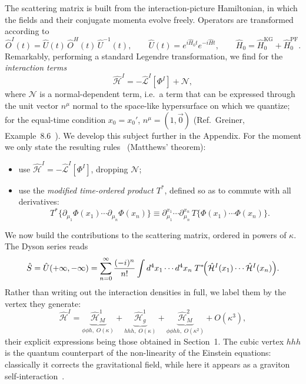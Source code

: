 \documentclass[12pt,a4paper,oneside]{article}
\numberwithin{equation}{section}   %
\begin{document}
The scattering matrix is built from the interaction-picture Hamiltonian, in
which the fields and their conjugate momenta evolve freely. Operators are
transformed according to
\begin{equation}
    \hat{O}^I(t)=\hat{U}(t)\,\hat{O}^H(t)\,\hat{U}^{-1}(t),\qquad
    \hat U(t)=e^{i\hat H_0t}e^{-i\hat Ht},\qquad
    \hat H_0=\hat H_0^{\mathrm{KG}}+\hat H_0^{\mathrm{PF}} .
\end{equation}
Remarkably, performing a standard Legendre transformation, we find for the
\textit{interaction terms}
\begin{equation}\label{HIN}
    \hat{\mathcal{H}}^I=-\hat{\mathcal{L}}^I[\Phi^I] + \mathcal{N},
\end{equation}
where $\mathcal{N}$ is a normal-dependent term, i.e.\ a term that can be
expressed through the unit vector $n^\mu$ normal to the space-like
hypersurface on which we quantize; for the equal-time condition $x_0=x_0'$,
$n^\mu=(1,\vec{0})$ (Ref.\ Greiner, Example~8.6~\cite{GreinerFQ}). We develop this subject
further in the Appendix. For the moment we only state the resulting rules~\cite{Weinberg1995}
(Matthews' theorem):
\begin{itemize}
    \item use $\hat{\mathcal{H}}^I=-\hat{\mathcal{L}}^I[\Phi^I]$, dropping $\mathcal{N}$;
    \item use the \textit{modified time-ordered product $T^*$}, defined so as to
    commute with all derivatives:
    \begin{equation}\label{Tstar}
        T^*\{\partial_{\mu_1}\Phi(x_1)\cdots\partial_{\mu_n}\Phi(x_n)\}
        \equiv \partial_{\mu_1}^{x_1}\cdots\partial_{\mu_n}^{x_n}\,
        T\{\Phi(x_1)\cdots\Phi(x_n)\} .
    \end{equation}
\end{itemize}

We now build the contributions to the scattering matrix, ordered in powers of
$\kappa$. The Dyson series reads
\begin{equation}\label{Dyson}
    \hat{S} = \hat{U}(+\infty,-\infty)
    = \sum_{n=0}^{\infty} \frac{(-i)^n}{n!}
    \int d^4x_1 \cdots d^4x_n\;
    T^*\!\Bigl(\hat{\mathcal{H}}^I(x_1)\cdots\hat{\mathcal{H}}^I(x_n)\Bigr).
\end{equation}
Rather than writing out the interaction densities in full, we label them by the
vertex they generate:
\begin{equation}\label{Hlabels}
\hat{\mathcal{H}}^I
=\underbrace{\hat{\mathcal{H}}_M^{1}}_{\phi\phi h,\;O(\kappa)}
+\underbrace{\hat{\mathcal{H}}_g^{1}}_{hhh,\;O(\kappa)}
+\underbrace{\hat{\mathcal{H}}_M^{2}}_{\phi\phi hh,\;O(\kappa^{2})}
+O(\kappa^{3}),
\end{equation}
their explicit expressions being those obtained in Section~1. The cubic
vertex $hhh$ is the quantum counterpart of the non-linearity of the Einstein
equations: classically it corrects the gravitational field, while here it
appears as a graviton self-interaction~\cite{Gupta1954,Feynman1963}.
\end{document}
